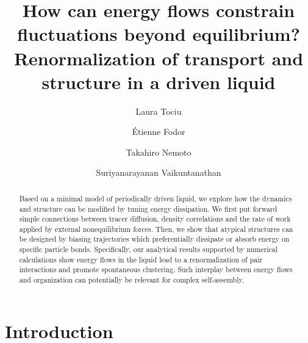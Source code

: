 \documentclass[pre, superscriptaddress, twocolumn,pre]{revtex4-1}
\begin{document}
\title{How can energy flows constrain fluctuations beyond equilibrium? Renormalization of transport and structure in a driven liquid}
\author{Laura Tociu}

\author{\'Etienne Fodor}

\author{Takahiro Nemoto}

\author{Suriyanarayanan Vaikuntanathan}

\begin{abstract}

Based on a minimal model of periodically driven liquid, we explore how the dynamics and structure can be modified by tuning energy dissipation. We first put forward simple connections between tracer diffusion, density correlations and the rate of work applied by external nonequilibrium forces. Then, we show that atypical structures can be designed by biasing trajectories which preferentially dissipate or absorb energy on specific particle bonds. Specifically, our analytical results supported by numerical calculations show energy flows in the liquid lead to a renormalization of pair interactions and promote spontaneous clustering. Such interplay between energy flows and organization can potentially be relevant for complex self-assembly.

\end{abstract}

\maketitle 




\section{Introduction}
\end{document}
